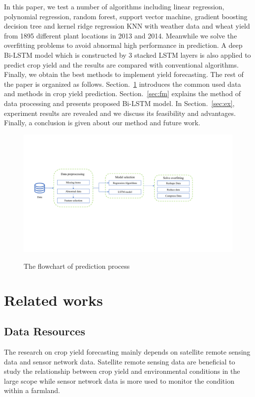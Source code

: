 \documentclass[conference, a4paper]{IEEEtran}
\begin{document}
  In this paper, we test a number of algorithms including linear regression, polynomial regression, random forest, support vector machine, gradient boosting decision tree and kernel ridge regression KNN with weather data and wheat yield from 1895 different plant locations in 2013 and 2014. Meanwhile we solve the overﬁtting problems to avoid abnormal high performance in prediction. A deep Bi-LSTM model which is constructed by 3 stacked LSTM layers is also applied to predict crop yield and the results are compared with conventional algorithms. Finally, we obtain the best methods to implement yield forecasting. The rest of the paper is organized as follows. Section.~\ref{sec:RW} introduces the common used data and methods in crop yield prediction. Section.~\ref{sec:fm} explains the method of data processing and presents proposed Bi-LSTM model. In Section.~\ref{sec:ex}, experiment results are revealed and we discuss its feasibility and advantages. Finally, a conclusion is given about our method and future work.

  \begin{figure}[!htb]
    \centering
    \includegraphics[width=\linewidth]{figures/arch.pdf}
    \label{fig:arch} 
    \caption{The flowchart of prediction process}
  \end{figure}

\section{Related works} \label{sec:RW}

  \subsection{Data Resources}

    The research on crop yield forecasting mainly depends on satellite remote sensing data and sensor network data. Satellite remote sensing data are beneficial to study the relationship between crop yield and environmental conditions in the large scope while sensor network data is more used to monitor the condition within a farmland. 
\end{document}
